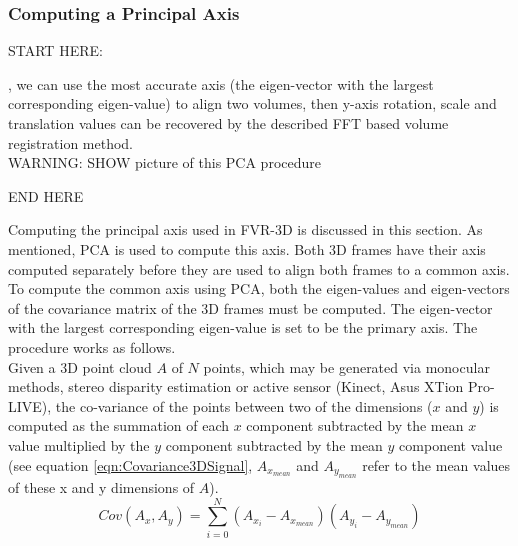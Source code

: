\subsubsection{Computing a Principal Axis}


START HERE:


		

, we can use the most accurate axis (the eigen-vector with the largest corresponding eigen-value) to align two volumes, then y-axis rotation, scale and translation values can be recovered by the described FFT based volume registration method. \\

WARNING: SHOW picture of this PCA procedure

END HERE

Computing the principal axis used in FVR-3D is discussed in this section. As mentioned, PCA is used to compute this axis. Both 3D frames have their axis computed separately before they are used to align both frames to a common axis. To compute the common axis using PCA, both the eigen-values and eigen-vectors of the covariance matrix of the 3D frames must be computed. The eigen-vector with the largest corresponding eigen-value is set to be the primary axis. The procedure works as follows. \\

Given a 3D point cloud $A$ of $N$ points, which may be generated via monocular methods, stereo disparity estimation or active sensor (Kinect, Asus XTion Pro-LIVE), the co-variance of the points between two of the dimensions ($x$ and $y$) is computed as the summation of each $x$ component subtracted by the mean $x$ value multiplied by the $y$ component subtracted by the mean $y$ component value (see equation \ref{eqn:Covariance3DSignal}, $A_{x_{mean}}$ and $A_{y_{mean}}$ refer to the mean values of these x and y dimensions of $A$). \\

\begin{equation} \label{eqn:Covariance3DSignal}
Cov(A_x,A_y) = \sum_{i=0}^{N}(A_{x_i} - A_{x_{mean}})(A_{y_i} - A_{y_{mean}})
\end{equation}

